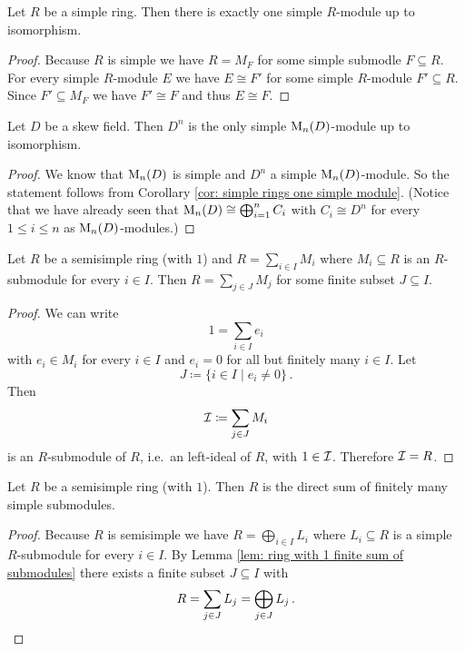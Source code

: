 \begin{cor}\label{cor: simple rings one simple module}
  Let $R$ be a simple ring.
  Then there is exactly one simple $R$-module up to isomorphism.
\end{cor}
\begin{proof}
  Because $R$ is simple we have $R = M_F$ for some simple submodle $F \subseteq R$.
  For every simple $R$-module $E$ we have $E \cong F'$ for some simple $R$-module $F' \subseteq R$.
  Since $F' \subseteq M_F$ we have $F' \cong F$ and thus $E \cong F$.
\end{proof}


\begin{cor}\label{cor: D^n only simple M_n(D)-module}
  Let $D$ be a skew field.
  Then $D^n$ is the only simple $\operatorname{M}_n(D)$-module up to isomorphism.
\end{cor}
\begin{proof}
  We know that $\operatorname{M}_n(D)$ is simple and $D^n$ a simple $\operatorname{M}_n(D)$-module.
  So the statement follows from Corollary \ref{cor: simple rings one simple module}.
  (Notice that we have already seen that $\operatorname{M}_n(D) \cong \bigoplus_{i=1}^n C_i$ with $C_i \cong D^n$ for every $1 \leq i \leq n$ as $\operatorname{M}_n(D)$-modules.)
\end{proof}


\begin{lem}\label{lem: ring with 1 finite sum of submodules}
  Let $R$ be a semisimple ring (with $1$) and $R = \sum_{i \in I} M_i$ where $M_i \subseteq R$ is an $R$-submodule for every $i \in I$.
  Then $R = \sum_{j \in J} M_j$ for some finite subset $J \subseteq I$.
\end{lem}
\begin{proof}
  We can write
  \[
      1
    = \sum_{i \in I} e_i
  \]
  with $e_i \in M_i$ for every $i \in I$ and $e_i = 0$ for all but finitely many $i \in I$. Let
  \[
              J
    \coloneqq \{i \in I \mid e_i \neq 0\} \,.
  \]
  Then
  \[
              \mathcal{I}
    \coloneqq \sum_{j \in J} M_i
  \]
  is an $R$-submodule of $R$, i.e.\ an left-ideal of $R$, with $1 \in \mathcal{I}$.
  Therefore $\mathcal{I} = R$.
\end{proof}


\begin{cor}\label{lem: semisimple ring with 1 only finitely many summands}
  Let $R$ be a semisimple ring (with $1$).
  Then $R$ is the direct sum of finitely many simple submodules.
\end{cor}
\begin{proof}
  Because $R$ is semisimple we have $R = \bigoplus_{i \in I} L_i$ where $L_i \subseteq R$ is a simple $R$-submodule for every $i \in I$.
  By Lemma \ref{lem: ring with 1 finite sum of submodules} there exists a finite subset $J \subseteq I$ with
  \[
      R
    = \sum_{j \in J} L_j
    = \bigoplus_{j \in J} L_j \,.
    \qedhere
  \]
\end{proof}





